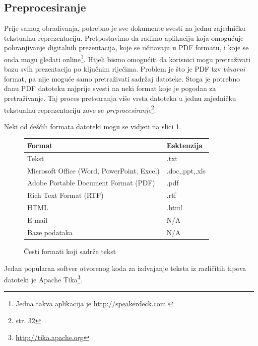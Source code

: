 \documentclass[a4paper,twoside,12pt]{scrreprt}
\begin{document}
\subsection{Preprocesiranje}

Prije samog obrađivanja, potrebno je sve dokumente svesti na jednu zajedničku tekstualnu reprezentaciju. Pretpostavimo da radimo aplikaciju koja omogućuje pohranjivanje digitalnih prezentacija, koje se učitavaju u PDF formatu, i koje se onda mogu gledati online\footnote{Jedna takva aplikacija je \url{http://speakerdeck.com}.}. Htjeli bismo omogućiti da korisnici mogu pretraživati bazu svih prezentacija po ključnim riječima. Problem je što je PDF tzv \textit{binarni} format, pa nije moguće samo pretraživati sadržaj datoteke. Stoga je potrebno danu PDF datoteku najprije svesti na neki format koje je pogodan za pretraživanje. Taj proces pretvaranja više vrsta datoteka u jednu zajedničku tekstualnu reprezentaciju zove se \textit{preprocesiranje}\footnote{\cite{taming} str. 32}.

Neki od češćih formata datoteki mogu se vidjeti na slici \ref{formats}.

{\renewcommand{\arraystretch}{1.2}
\begin{figure}[H]
  \centering
  \begin{tabular}{|l|l|}
    \hline
    \textbf{Format}                            & \textbf{Esktenzija} \\
    \hline
    Tekst                                      & .txt                \\
    \hline
    Microsoft Office (Word, PowerPoint, Excel) & .doc,.ppt,.xls      \\
    \hline
    Adobe Portable Document Format (PDF)       & .pdf                \\
    \hline
    Rich Text Format (RTF)                     & .rtf                \\
    \hline
    HTML                                       & .html               \\
    \hline
    E-mail                                     & N/A                 \\
    \hline
    Baze podataka                              & N/A                 \\
    \hline
  \end{tabular}
  \caption{Česti formati koji sadrže tekst}
  \label{formats}
\end{figure}
}

Jedan popularan softver otvorenog koda za izdvajanje teksta iz različitih tipova datoteki je Apache Tika\footnote{\url{http://tika.apache.org}}.
\end{document}
